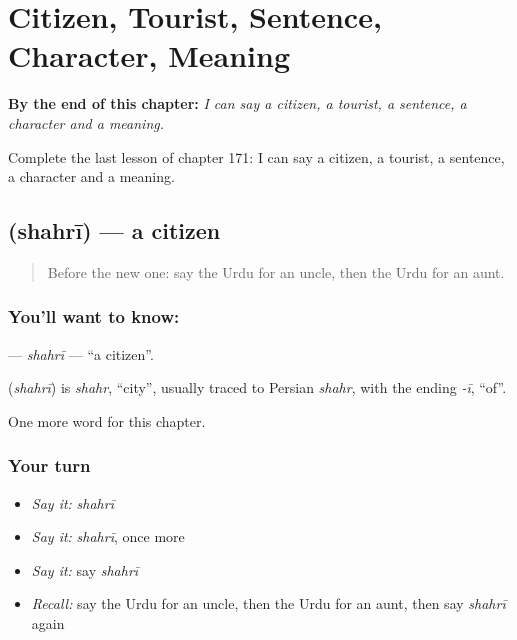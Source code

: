 
\chapter{Citizen, Tourist, Sentence, Character, Meaning}
\label{ch:ur-citizen-tourist-sentence-character-meaning}

\begin{chapteropening}
\textbf{By the end of this chapter:} \emph{I can say a citizen, a tourist, a sentence, a character and a meaning.}

Complete the last lesson of chapter 171: I can say a citizen, a tourist, a sentence, a character and a meaning.
\end{chapteropening}

\section[\texorpdfstring{\ur{شہری} (shahrī)}{شہری (shahrī)}]{ (shahrī) — a citizen}

\label{lesson:UR-C171-shahri}



\begin{quote}
Before the new one: say the Urdu for an uncle, then the Urdu for an aunt.
\end{quote}

\subsection*{You'll want to know: }
\textbf{} — \emph{shahrī} — \textquotedblleft{}a citizen\textquotedblright{}.

\begin{cousinweb}
\textbf{} (\emph{shahrī}) is \emph{shahr}, \textquotedblleft{}city\textquotedblright{}, usually traced to Persian \emph{shahr}, with the ending \emph{-ī}, \textquotedblleft{}of\textquotedblright{}.
\end{cousinweb}

\begin{grammarlens}[title={What you've built}]
One more word for this chapter.
\end{grammarlens}

\subsection*{Your turn}
\begin{itemize}
\raggedright
  \item \emph{Say it:} \emph{shahrī}
  \item \emph{Say it:} \emph{shahrī}, once more
  \item \emph{Say it:} say \emph{shahrī}
  \item \emph{Recall:} say the Urdu for an uncle, then the Urdu for an aunt, then say \emph{shahrī} again
\end{itemize}

